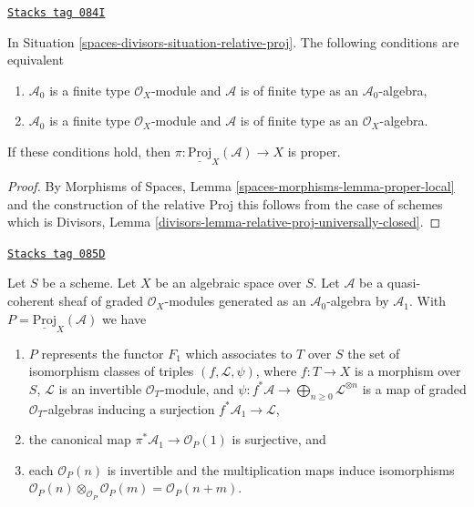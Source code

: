 \begin{lemma}
\label{spaces-divisors-lemma-relative-proj-proper}
\href{https://stacks.math.columbia.edu/tag/084I}{\texttt{Stacks tag 084I}}

In Situation \ref{spaces-divisors-situation-relative-proj}.
The following conditions are equivalent
\begin{enumerate}
\item $\mathcal{A}_0$ is a finite type $\mathcal{O}_X$-module
and $\mathcal{A}$ is of finite type as an $\mathcal{A}_0$-algebra,
\item $\mathcal{A}_0$ is a finite type $\mathcal{O}_X$-module
and $\mathcal{A}$ is of finite type as an $\mathcal{O}_X$-algebra.
\end{enumerate}
If these conditions hold, then
$\pi : \underline{\text{Proj}}_X(\mathcal{A}) \to X$
is proper.
\end{lemma}

\begin{proof}
By Morphisms of Spaces, Lemma
\ref{spaces-morphisms-lemma-proper-local}
and the construction of the relative Proj this follows from the
case of schemes which is
Divisors, Lemma \ref{divisors-lemma-relative-proj-universally-closed}.
\end{proof}

\begin{lemma}
\label{spaces-divisors-lemma-relative-proj-generated-in-degree-1}
\href{https://stacks.math.columbia.edu/tag/085D}{\texttt{Stacks tag 085D}}

Let $S$ be a scheme. Let $X$ be an algebraic space over $S$.
Let $\mathcal{A}$ be a quasi-coherent sheaf of graded $\mathcal{O}_X$-modules
generated as an $\mathcal{A}_0$-algebra by $\mathcal{A}_1$.
With $P = \underline{\text{Proj}}_X(\mathcal{A})$ we have
\begin{enumerate}
\item $P$ represents the functor $F_1$ which associates to
$T$ over $S$ the set of isomorphism classes of
triples $(f, \mathcal{L}, \psi)$, where $f : T \to X$ is a morphism
over $S$, $\mathcal{L}$ is an invertible $\mathcal{O}_T$-module, and
$\psi : f^*\mathcal{A} \to \bigoplus_{n \geq 0} \mathcal{L}^{\otimes n}$
is a map of graded $\mathcal{O}_T$-algebras inducing a surjection
$f^*\mathcal{A}_1 \to \mathcal{L}$,
\item the canonical map $\pi^*\mathcal{A}_1 \to \mathcal{O}_P(1)$ is
surjective, and
\item each $\mathcal{O}_P(n)$ is invertible
and the multiplication maps induce isomorphisms
$\mathcal{O}_P(n) \otimes_{\mathcal{O}_P} \mathcal{O}_P(m) =
\mathcal{O}_P(n + m)$.
\end{enumerate}
\end{lemma}

